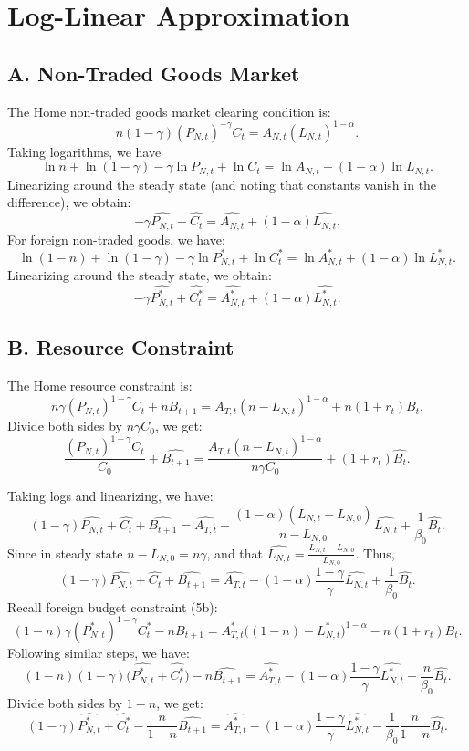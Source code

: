 \documentclass[a4paper,12pt]{article} %
\theoremstyle{nonitalic}
\begin{document}
\section{Log-Linear Approximation}
\subsection*{A. Non-Traded Goods Market}
The Home non-traded goods market clearing condition is:
\[
n(1-\gamma)(P_{N,t})^{-\gamma}C_t = A_{N,t}(L_{N,t})^{1-\alpha}.
\]
Taking logarithms, we have
\[
\ln n + \ln(1-\gamma) - \gamma\ln P_{N,t} + \ln C_t = \ln A_{N,t} + (1-\alpha)\ln L_{N,t}.
\]
Linearizing around the steady state (and noting that constants vanish in the difference), we obtain:
\[
-\gamma  \widehat{P_{N,t}} + \widehat{C_t} =  \widehat{A_{N,t}} + (1-\alpha)  \widehat{L_{N,t}}. \tag{7a}
\]
For foreign non-traded goods, we have:
\[
\ln (1-n) + \ln(1-\gamma) - \gamma\ln P^*_{N,t} + \ln C^*_t = \ln A^*_{N,t} + (1-\alpha)\ln L^*_{N,t}.
\]
Linearizing around the steady state, we obtain:
\[
-\gamma  \widehat{P^*_{N,t}} + \widehat{C^*_t} =  \widehat{A^*_{N,t}} + (1-\alpha)  \widehat{L^*_{N,t}}. \tag{7b}
\]

\subsection*{B. Resource Constraint}
The Home resource constraint is:
\[
n\gamma (P_{N,t})^{1-\gamma}C_t + nB_{t+1} = A_{T,t}(n-L_{N,t})^{1-\alpha}+ n(1+r_t)B_t.
\]
Divide both sides by $n \gamma C_0$, we get:
\[
\frac{(P_{N,t})^{1-\gamma}C_t}{C_0} + \widehat{B_{t+1}} = \frac{A_{T,t}(n-L_{N,t})^{1-\alpha}}{n\gamma C_0} + (1+r_t)\widehat{B_t}.
\]

Taking logs and linearizing, we have:
\[
(1-\gamma)  \widehat{P_{N,t}} + \widehat{C_t} + \widehat{B_{t+1}} = \widehat{A_{T,t}} - \frac{(1-\alpha)(L_{N,t} - L_{N,0})}{n-L_{N,0}}  \widehat{L_{N,t}} + \frac{1}{\beta_0} \widehat{B_t}.
\]
Since in steady state $n-L_{N,0}= n\gamma$, and that $\widehat{L_{N,t}} = \frac{L_{N,t} - L_{N,0}}{L_{N,0}}$. Thus,
\[
(1-\gamma)  \widehat{P_{N,t}} + \widehat{C_t} + \widehat{B_{t+1}} = \widehat{A_{T,t}} - (1-\alpha) \frac{1 - \gamma}{\gamma} \widehat{L_{N,t}} + \frac{1}{\beta_0} \widehat{B_t}. \tag{7c}
\]
Recall foreign budget constraint (5b):
\[
(1-n)\gamma (P^*_{N,t})^{1-\gamma}C^*_t - n B_{t+1} = A^*_{T,t}\big((1-n)-L^*_{N,t}\big)^{1-\alpha} - n(1+r_t)B_t.
\]
Following similar steps, we have:
\[
(1-n) (1-\gamma) \bigl(\widehat{P^*_{N,t}} + \widehat{C^*_t} \bigr) - n \widehat{B_{t+1}} = \widehat{A^*_{T,t}} - (1-\alpha) \frac{1 - \gamma}{\gamma} \widehat{L^*_{N,t}} - \frac{n}{\beta_0} \widehat{B_t}.
\]
Divide both sides by $1-n$, we get:
\[
(1-\gamma)  \widehat{P^*_{N,t}} + \widehat{C^*_t} - \frac{n}{1-n} \widehat{B_{t+1}} = \widehat{A^*_{T,t}} - (1-\alpha) \frac{1 - \gamma}{\gamma} \widehat{L^*_{N,t}} - \frac{1}{\beta_0} \frac{n}{1-n} \widehat{B_t}. \tag{7d}
\]
\end{document}
